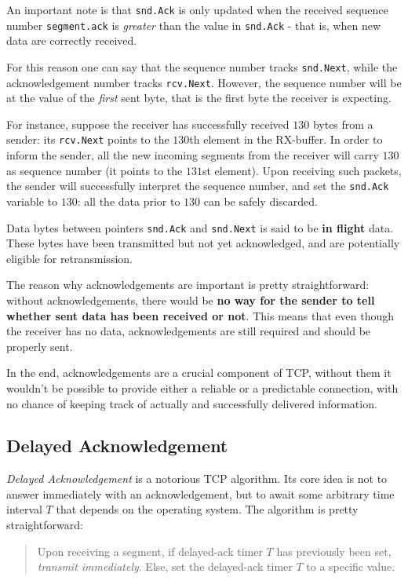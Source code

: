\documentclass[10pt]{extbook}
\begin{document}
An important note is that \texttt{snd.Ack} is only updated when the received
sequence number \texttt{segment.ack} is \emph{greater} than the value in
\texttt{snd.Ack} \-- that is, when new data are correctly received.

For this reason one can say that the sequence number tracks \texttt{snd.Next},
while the acknowledgement number tracks \texttt{rcv.Next}. However, the
sequence number will be at the value of the \emph{first} sent byte, that is the
first byte the receiver is expecting.

For instance, suppose the receiver has successfully received $130$ bytes from a
sender: its \texttt{rcv.Next} points to the $130$th element in the RX-buffer.
In order to inform the sender, all the new incoming segments from the receiver
will carry $130$ as sequence number (it points to the $131$st element). Upon
receiving such packets, the sender will successfully interpret the sequence
number, and set the \texttt{snd.Ack} variable to $130$: all the data prior to
$130$ can be safely discarded.

Data bytes between pointers \texttt{snd.Ack} and \texttt{snd.Next} is said to
be \textbf{in flight} data. These bytes have been transmitted but not yet
acknowledged, and are potentially eligible for retransmission.

The reason why acknowledgements are important is pretty straightforward: without
acknowledgements, there would be \textbf{no way for the sender to tell whether
sent data has been received or not}. This means that even though the receiver
has no data, acknowledgements are still required and should be properly sent.

In the end, acknowledgements are a crucial component of TCP, without them it
wouldn't be possible to provide either a reliable or a predictable connection,
with no chance of keeping track of actually and successfully delivered
information.


\subsection{Delayed Acknowledgement}

\emph{Delayed Acknowledgement} is a notorious TCP algorithm. Its core idea is
not to answer immediately with an acknowledgement, but to await some arbitrary
time interval $T$ that depends on the operating system. The algorithm is pretty
straightforward:

\begin{quote}
Upon receiving a segment, if delayed-ack timer $T$ has previously been set,
\emph{transmit immediately}. Else, set the delayed-ack timer $T$ to a specific
value.
\end{quote}
\end{document}
